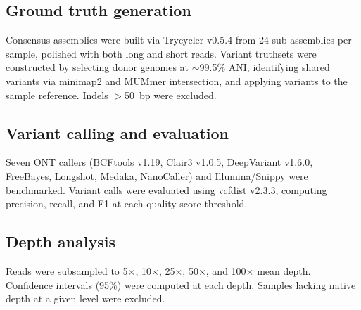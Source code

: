 \documentclass[11pt]{article}
\begin{document}
\subsection{Ground truth generation}
Consensus assemblies were built via Trycycler v0.5.4 from 24 sub-assemblies per sample, polished with both long and short reads. Variant truthsets were constructed by selecting donor genomes at $\sim$99.5\% ANI, identifying shared variants via minimap2 and MUMmer intersection, and applying variants to the sample reference. Indels $>$50~bp were excluded.

\subsection{Variant calling and evaluation}
Seven ONT callers (BCFtools v1.19, Clair3 v1.0.5, DeepVariant v1.6.0, FreeBayes, Longshot, Medaka, NanoCaller) and Illumina/Snippy were benchmarked. Variant calls were evaluated using vcfdist v2.3.3, computing precision, recall, and F1 at each quality score threshold.

\subsection{Depth analysis}
Reads were subsampled to 5$\times$, 10$\times$, 25$\times$, 50$\times$, and 100$\times$ mean depth. Confidence intervals (95\%) were computed at each depth. Samples lacking native depth at a given level were excluded.


\end{document}
